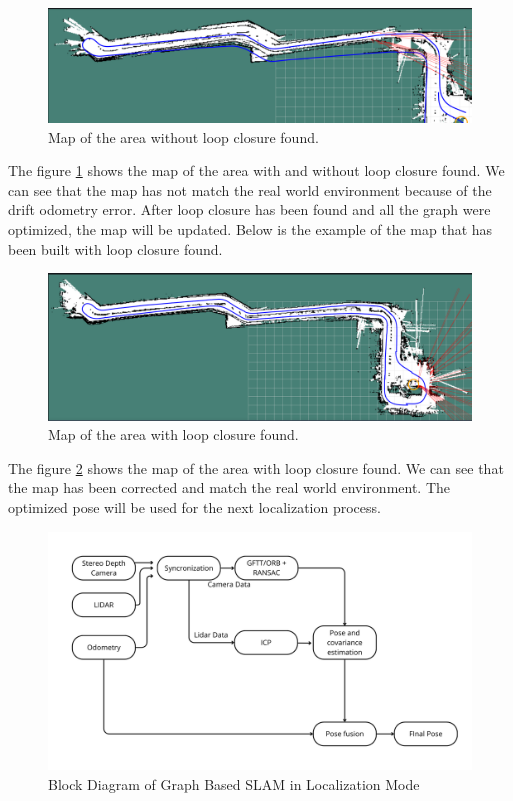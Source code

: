 \documentclass[conference]{IEEEtran}
\begin{document}
\begin{figure}[H]
	\centering
	\includegraphics[width=\linewidth]{../konten/map_salah.png}
	\caption{Map of the area without loop closure found.}
	\label{fig:map}
\end{figure}

The figure \ref{fig:map} shows the map of the area with and without loop closure found. We can see that the map has not match the real world environment because of the drift odometry error. After loop closure has been found and all the graph were optimized, the map will be updated. Below is the example of the map that has been built with loop closure found.

\begin{figure}[H]
	\centering
	\includegraphics[width=\linewidth]{../konten/map_benar.png}
	\caption{Map of the area with loop closure found.}
	\label{fig:map_corrected}
\end{figure}

The figure \ref{fig:map_corrected} shows the map of the area with loop closure found. We can see that the map has been corrected and match the real world environment. The optimized pose will be used for the next localization process.

\begin{figure}[H]
	\centering
	\includegraphics[width=\linewidth]{../konten/nav_loc2.png}
	\caption{Block Diagram of Graph Based SLAM in Localization Mode}
	\label{fig:slam_system_loc}
\end{figure} 
\end{document}
